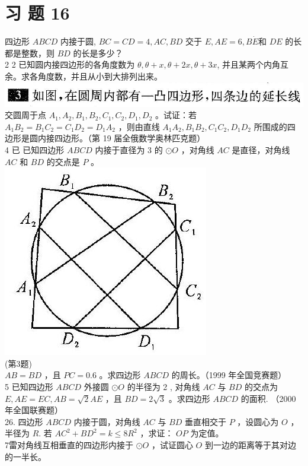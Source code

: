 \documentclass[10pt]{article}
\begin{document}
\section*{习 题 16}
四边形 $A B C D$ 内接于圆, $B C=C D=4, A C, B D$ 交于 $E, A E=6, B \dot{E}$和 $D E$ 的长都是整数，则 $B D$ 的长是多少？\\
2 2 已知圆内接四边形的各角度数为 $\theta, \theta+x, \theta+2 x, \theta+3 x$, 并且某两个内角互余。求各角度数，并且从小到大排列出来。\\
\includegraphics[max width=\textwidth]{2024_10_30_2c8f45efd4a519b08e1ag-153(1)}交圆周于点 $A_{1}, A_{2}, B_{1}, B_{2}, C_{1}, C_{2}, D_{1}, D_{2}$ 。试证：若 $A_{1} B_{2}=B_{1} C_{2}=C_{1} D_{2}=D_{1} A_{2}$ ，则由直线 $A_{1} A_{2}, B_{1} B_{2}, C_{1} C_{2}, D_{1} D_{2}$ 所围成的四边形是圆内接四边形。（第 19 届全俄数学奥林匹克题）\\
4 已 已知四边形 $A B C D$ 内接于直径为 3 的 $\odot O$ ，对角线 $A C$ 是直径，对角线 $A C$ 和 $B D$ 的交点是 $P$ 。\\
\includegraphics[max width=\textwidth, center]{2024_10_30_2c8f45efd4a519b08e1ag-153}\\
(第3题)\\
$A B=B D$ ，且 $P C=0.6$ 。求四边形 $A B C D$ 的周长。（1999 年全国竞赛题）\\
5 已知四边形 $A B C D$ 外接圆 $\odot O$ 的半径为 2 , 对角线 $A C$ 与 $B D$ 的交点为 $E, A E=E C, A B=\sqrt{2} A E$ ，且 $B D=2 \sqrt{3}$ 。求四边形 $A B C D$ 的面积. （2000 年全国联赛题）\\
26. 四边形 $A B C D$ 内接于圆，对角线 $A C$ 与 $B D$ 垂直相交于 $P$ ，设圆心为 $O$ ，半径为 $R$. 若 $A C^{2}+B D^{2}=k \leqslant 8 R^{2}$ ，求证： $O P$ 为定值。\\
7雷对角线互相垂直的四边形内接于 $\odot O$ ，试证圆心 $O$ 到一边的距离等于其对边的一半长。
\end{document}
